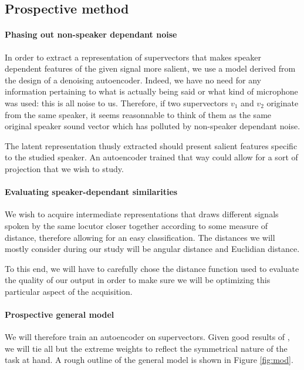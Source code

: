 \documentclass[conference]{IEEEtran}
\begin{document}
\subsection{Prospective method}
\label{subsec:prosp}

\paragraph{Phasing out non-speaker dependant noise}

In order to extract a representation of supervectors that makes speaker
dependent features of the given signal more salient, we use a model derived from
the design of a denoising autoencoder. Indeed, we have no need for any
information pertaining to what is actually being said or what kind of microphone
was used: this is all noise to us. Therefore, if two supervectors $v_1$ and $v_2$ originate from
the same speaker, it seems reasonnable to think of them as the same original \og
speaker\fg{} sound vector which has polluted by non-speaker dependant noise.

The latent representation thusly extracted should present salient features
specific to the studied speaker. An autoencoder trained that way could allow for
a sort of projection that we wish to study.

\paragraph{Evaluating speaker-dependant similarities}

We wish to acquire intermediate representations that draws different signals
spoken by the same locutor closer together according to some measure of
distance, therefore allowing for an easy classification. The distances we will
mostly consider during our study will be angular distance and Euclidian
distance.

To this end, we will have to carefully chose the distance function used to
evaluate the \og quality\fg{} of our output in order to make sure we will be
optimizing this particular aspect of the acquisition.

\paragraph{Prospective general model}

We will therefore train an autoencoder on supervectors. Given good results of
\cite{vukotic:hal-01314302}, we will tie all but the extreme weights to reflect the
symmetrical nature of the task at hand. A rough outline of the general model is
shown in Figure \ref{fig:mod}.
\end{document}
